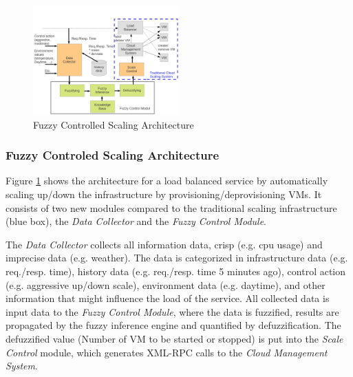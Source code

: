 
\begin{figure}[ht]
\begin{center}
\includegraphics[width=0.5\textwidth]{fig/architecture}
\end{center}
\caption{Fuzzy Controlled Scaling Architecture}
\label{fig:fuzzy_control_architecture}
\end{figure}

\subsubsection{Fuzzy Controled Scaling Architecture}\label{fuzzyScalingArchtecture}
Figure \ref{fig:fuzzy_control_architecture} shows the architecture for a load balanced service by automatically scaling up/down the infrastructure by provisioning/deprovisioning VMs. It consists of two new modules compared to the traditional scaling infrastructure (blue box), the \textit{Data Collector} and the \textit{Fuzzy Control Module}.

The \textit{Data Collector} collects all information data, crisp (e.g. cpu usage) and imprecise data (e.g. weather). The data is categorized in infrastructure data (e.g. req./resp. time), history data (e.g. req./resp. time 5 minutes ago), control action (e.g. aggressive up/down scale), environment data (e.g. daytime), and other information that might influence the load of the service. %
All collected data is input data to the \textit{Fuzzy Control Module}, where the data is fuzzified, results are propagated by the fuzzy inference engine and quantified by defuzzification. The defuzzified value (Number of VM to be started or stopped) is put into the \textit{Scale Control} module, which generates XML-RPC calls to the \textit{Cloud Management System}.

